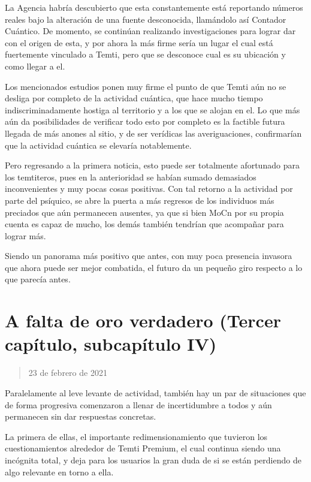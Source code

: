 \documentclass[
  spanish,
]{book}
\begin{document}
La Agencia habría descubierto que esta constantemente está reportando números reales bajo la alteración de una fuente desconocida, llamándolo así Contador Cuántico. De momento, se continúan realizando investigaciones para lograr dar con el origen de esta, y por ahora la más firme sería un lugar el cual está fuertemente vinculado a Temti, pero que se desconoce cual es su ubicación y como llegar a el.

Los mencionados estudios ponen muy firme el punto de que Temti aún no se desliga por completo de la actividad cuántica, que hace mucho tiempo indiscriminadamente hostiga al territorio y a los que se alojan en el. Lo que más aún da posibilidades de verificar todo esto por completo es la factible futura llegada de más anones al sitio, y de ser verídicas las averiguaciones, confirmarían que la actividad cuántica se elevaría notablemente.

Pero regresando a la primera noticia, esto puede ser totalmente afortunado para los temtiteros, pues en la anterioridad se habían sumado demasiados inconvenientes y muy pocas cosas positivas. Con tal retorno a la actividad por parte del psíquico, se abre la puerta a más regresos de los individuos más preciados que aún permanecen ausentes, ya que si bien MoCn por su propia cuenta es capaz de mucho, los demás también tendrían que acompañar para lograr más.

Siendo un panorama más positivo que antes, con muy poca presencia invasora que ahora puede ser mejor combatida, el futuro da un pequeño giro respecto a lo que parecía antes.

\hypertarget{a-falta-de-oro-verdadero-tercer-capuxedtulo-subcapuxedtulo-iv}{%
\section{A falta de oro verdadero (Tercer capítulo, subcapítulo IV)}\label{a-falta-de-oro-verdadero-tercer-capuxedtulo-subcapuxedtulo-iv}}

\begin{quote}
23 de febrero de 2021
\end{quote}

Paralelamente al leve levante de actividad, también hay un par de situaciones que de forma progresiva comenzaron a llenar de incertidumbre a todos y aún permanecen sin dar respuestas concretas.

La primera de ellas, el importante redimensionamiento que tuvieron los cuestionamientos alrededor de Temti Premium, el cual continua siendo una incógnita total, y deja para los usuarios la gran duda de si se están perdiendo de algo relevante en torno a ella.
\end{document}
